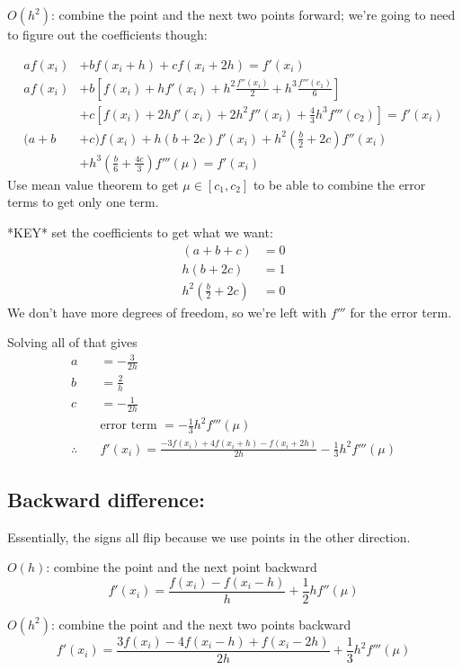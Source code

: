\documentclass[12pt]{article}
\begin{document}
\underline{$O(h^2)$}: combine the point and the next two points forward; we're going to need to figure out the coefficients though:

\begin{align*}
a f(x_i) &+ b f(x_i + h) + c f(x_i + 2h) = f'(x_i) \\
%
a f(x_i) &+ b[f(x_i) + hf'(x_i) + h^2\frac{f''(x_i)}{2} + h^3\frac{f'''(c_1)}{6}] \nonumber \\
&+ c[f(x_i) + 2h f'(x_i) + 2 h^2 f''(x_i) + \frac{4}{3} h^3 f'''(c_2)] =f'(x_i)\\
(a + b &+ c)f(x_i) + h(b + 2c)f'(x_i) + h^2(\frac{b}{2} + 2c) f''(x_i) \\
&+ h^3(\frac{b}{6} +  \frac{4c}{3}) f'''(\mu) = f'(x_i)
\end{align*}
%
Use mean value theorem to get $\mu \in [c_1, c_2]$ to be able to combine the error terms to get only one term.

*KEY* set the coefficients to get what we want:
%
\begin{align*}
(a + b + c) &= 0\\
h(b + 2c) &= 1\\
h^2(\frac{b}{2} + 2c) &= 0
\end{align*}
%
We don't have more degrees of freedom, so we're left with $f'''$ for the error term. 

Solving all of that gives
%
\begin{align*}
a &= -\frac{3}{2h} \\
b &= \frac{2}{h} \\
c &= -\frac{1}{2h} \\
&\text{error term } = -\frac{1}{3}h^2 f'''(\mu) \\
\therefore \quad &\boxed{f'(x_i) = \frac{-3 f(x_i) + 4f(x_i + h) - f(x_i + 2h)}{2h} -\frac{1}{3}h^2 f'''(\mu)}
\end{align*}


\subsection*{Backward difference:}
Essentially, the signs all flip because we use points in the other direction.

\underline{$O(h)$}: combine the point and the next point backward
\[f'(x_i) = \frac{f(x_i) - f(x_i - h)}{h} + \frac{1}{2}hf''(\mu)\]

\underline{$O(h^2)$}: combine the point and the next two points backward
%
\[f'(x_i) = \frac{3 f(x_i) - 4f(x_i - h) + f(x_i - 2h)}{2h} + \frac{1}{3}h^2 f'''(\mu)\]
\end{document}
